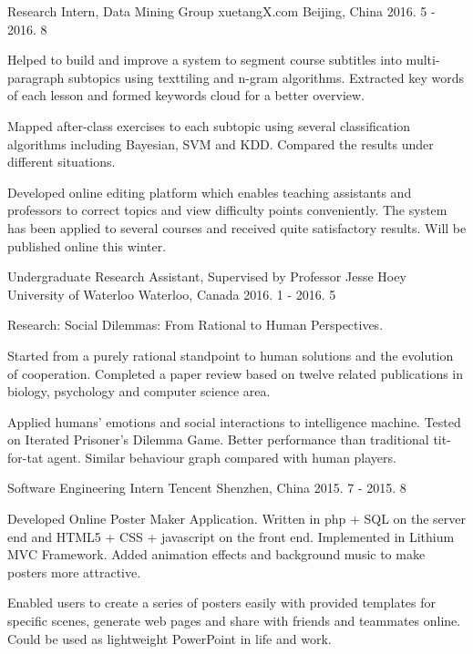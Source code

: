 \begin{cventries}
  \cventry
    {Research Intern, Data Mining Group}
    {xuetangX.com}
    {Beijing, China}
    {2016. 5 - 2016. 8}
    {
      \begin{cvitems}
      \item{Helped to build and improve a system to segment course subtitles into multi-paragraph subtopics using texttiling and n-gram algorithms. Extracted key words of each lesson and formed keywords cloud for a better overview.}
      \item{Mapped after-class exercises to each subtopic using several classification algorithms including Bayesian, SVM and KDD. Compared the results under different situations.}
      \item{Developed online editing platform which enables teaching assistants and professors to correct topics and view difficulty points conveniently. The system has been applied to several courses and received quite satisfactory results. Will be published online this winter.}
      \end{cvitems}
    }
  \cventry
    {Undergraduate Research Assistant, Supervised by Professor Jesse Hoey}
    {University of Waterloo}
    {Waterloo, Canada}
    {2016. 1 - 2016. 5}
    {
      \begin{cvitems}
        \item {Research: Social Dilemmas: From Rational to Human Perspectives.}
        \item {Started from a purely rational standpoint to human solutions and the evolution of cooperation. Completed a paper review based on twelve related publications in biology, psychology and computer science area.}
        \item {Applied humans' emotions and social interactions to intelligence machine. Tested on Iterated Prisoner's Dilemma Game. Better performance than traditional tit-for-tat agent. Similar behaviour graph compared with human players.}
      \end{cvitems}
    }
  \cventry
    {Software Engineering Intern}
    {Tencent}
    {Shenzhen, China}
    {2015. 7 - 2015. 8}
    {
      \begin{cvitems}
        \item {Developed Online Poster Maker Application. Written in php + SQL on the server end and HTML5 + CSS + javascript on the front end. Implemented in Lithium MVC Framework. Added animation effects and background music to make posters more attractive.}
        \item {Enabled users to create a series of posters easily with provided templates for specific scenes, generate web pages and share with friends and teammates online. Could be used as lightweight PowerPoint in life and work.}

\end{cvitems}}
\end{cventries}

